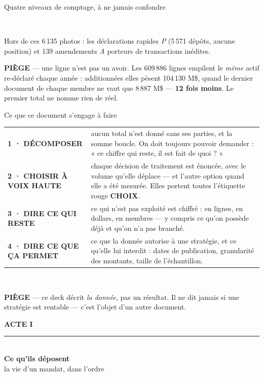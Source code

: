 \documentclass[11pt,aspectratio=169]{beamer}
\newcommand{\piege}[1]{%
  \colorbox{warnorange!12}{\parbox{\dimexpr\linewidth-8pt}{\scriptsize
    \textbf{\textcolor{warnorange}{PIÈGE}}\; --- #1}}}
\newcommand{\partdivider}[4]{%
  {\setbeamercolor{background canvas}{bg=#1}
  \begin{frame}[plain]
    \centering\vfill
    {\color{white}\Large\textbf{#2}}\\[3.5mm]
    {\color{white!75}\rule{0.40\textwidth}{1pt}}\\[4.5mm]
    {\color{white}\fontsize{32}{36}\selectfont\textbf{#3}}\\[5.5mm]
    {\color{white!88}\large #4}
    \vfill
  \end{frame}}}
\begin{document}
\begin{frame}{Quatre niveaux de comptage, à ne jamais confondre}
\begin{tabular}{@{}l l r >{\raggedright\arraybackslash}p{6.8cm}@{}}
    \bottomrule
  \end{tabular}\\[1.2mm]
  {\scriptsize\color{black!60} Hors de ces 6\,135 photos : les déclarations rapides \emph{P}
  (5\,571 dépôts, aucune position) et 139 amendements \emph{A} porteurs de transactions inédites.}\\[1.5mm]
  \piege{une ligne n'est pas un avoir. Les 609\,886 lignes empilent le \emph{même} actif re-déclaré
  chaque année : additionnées elles pèsent 104\,130 M\$, quand le dernier document de chaque membre
  ne vaut que 8\,887 M\$ --- \textbf{12 fois moins}. Le premier total ne nomme rien de réel.}
\end{frame}

\begin{frame}{Ce que ce document s'engage à faire}
  \centering\footnotesize
  \begin{tabular}{@{}l p{8.4cm}@{}}
    \toprule
    \textcolor{helec}{\textbf{1 · DÉCOMPOSER}} &
      aucun total n'est donné sans ses parties, et la somme boucle. On doit toujours pouvoir
      demander : « ce chiffre qui reste, il est fait de quoi ? »\\[1.5mm]
    \textcolor{alertred}{\textbf{2 · CHOISIR À VOIX HAUTE}} &
      chaque décision de traitement est énoncée, avec le volume qu'elle déplace --- et l'autre
      option quand elle a été mesurée. Elles portent toutes l'étiquette rouge
      \textcolor{alertred}{\textbf{CHOIX}}.\\[1.5mm]
    \textcolor{warnorange}{\textbf{3 · DIRE CE QUI RESTE}} &
      ce qui n'est pas exploité est chiffré : en lignes, en dollars, en membres --- y compris
      ce qu'on possède déjà et qu'on n'a pas branché.\\[1.5mm]
    \textcolor{okgreen}{\textbf{4 · DIRE CE QUE ÇA PERMET}} &
      ce que la donnée autorise à une stratégie, et ce qu'elle lui interdit : dates de
      publication, granularité des montants, taille de l'échantillon.\\
    \bottomrule
  \end{tabular}\\[3.5mm]
  \piege{ce deck décrit \emph{la donnée}, pas un résultat. Il ne dit jamais si une stratégie est
  rentable --- c'est l'objet d'un autre document.}
\end{frame}

\partdivider{helec}{ACTE I}{Ce qu'ils déposent}{la vie d'un mandat, dans l'ordre}
\end{document}
